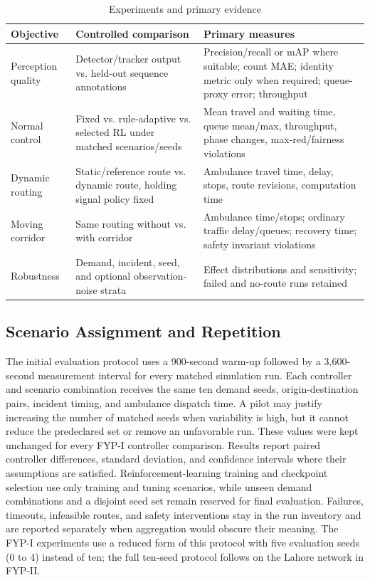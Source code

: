 \begin{table}[htbp]
\centering
\caption{Experiments and primary evidence}
\label{tab:experiments}
\begin{tabularx}{\textwidth}{p{}p{}Y}
\toprule
\textbf{Objective} & \textbf{Controlled comparison} & \textbf{Primary measures}\\
\midrule
Perception quality & Detector/tracker output vs. held-out sequence annotations & Precision/recall or mAP where suitable; count MAE; identity metric only when required; queue-proxy error; throughput\\
Normal control & Fixed vs. rule-adaptive vs. selected RL under matched scenarios/seeds & Mean travel and waiting time, queue mean/max, throughput, phase changes, max-red/fairness violations\\
Dynamic routing & Static/reference route vs. dynamic route, holding signal policy fixed & Ambulance travel time, delay, stops, route revisions, computation time\\
Moving corridor & Same routing without vs. with corridor & Ambulance time/stops; ordinary traffic delay/queues; recovery time; safety invariant violations\\
Robustness & Demand, incident, seed, and optional observation-noise strata & Effect distributions and sensitivity; failed and no-route runs retained\\
\bottomrule
\end{tabularx}
\end{table}

\subsection{Scenario Assignment and Repetition}

The initial evaluation protocol uses a 900-second warm-up followed by a 3,600-second measurement interval for every matched simulation run. Each controller and scenario combination receives the same ten demand seeds, origin-destination pairs, incident timing, and ambulance dispatch time. A pilot may justify increasing the number of matched seeds when variability is high, but it cannot reduce the predeclared set or remove an unfavorable run. These values were kept unchanged for every FYP-I controller comparison. Results report paired controller differences, standard deviation, and confidence intervals where their assumptions are satisfied. Reinforcement-learning training and checkpoint selection use only training and tuning scenarios, while unseen demand combinations and a disjoint seed set remain reserved for final evaluation. Failures, timeouts, infeasible routes, and safety interventions stay in the run inventory and are reported separately when aggregation would obscure their meaning. The FYP-I experiments use a reduced form of this protocol with five evaluation seeds (0 to 4) instead of ten; the full ten-seed protocol follows on the Lahore network in FYP-II.

